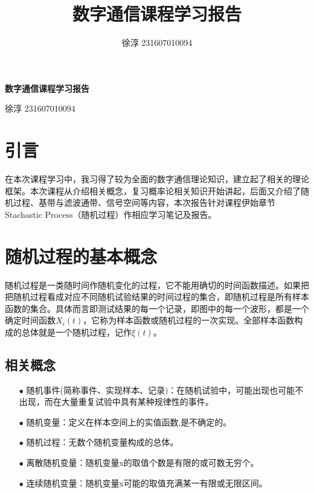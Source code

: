 \documentclass[12pt,a4paper,oneside]{ctexart}
\title{\vspace{-4cm}\textbf{数字通信课程学习报告}}
\author{徐淳 231607010094}
\begin{document}
\pagestyle{plain}
\setlength{\topmargin}{-18mm}
\begin{center}
    \textbf{\huge{数字通信课程学习报告}}
\end{center}
\begin{center}
    \large{徐淳 231607010094}
\end{center}
\section{引言}  
在本次课程学习中，我习得了较为全面的数字通信理论知识，建立起了相关的理论框架。本次课程从介绍相关概念，复习概率论相关知识开始讲起，后面又介绍了随机过程、基带与滤波通带、信号空间等内容，本次报告针对课程伊始章节Stachastic Process（随机过程）作相应学习笔记及报告。
\section{随机过程的基本概念}
随机过程是一类随时间作随机变化的过程，它不能用确切的时间函数描述。如果把把随机过程看成对应不同随机试验结果的时间过程的集合，即随机过程是所有样本函数的集合。具体而言即测试结果的每一个记录，即图中的每一个波形，都是一个确定时间函数$X_{i}(t)$，它称为样本函数或随机过程的一次实现。全部样本函数构成的总体就是一个随机过程，记作$\xi(t)$。
    \subsection{相关概念}
        \begin{itemize}
            \item[$\bullet$] 随机事件(简称事件、实现样本、记录)：在随机试验中，可能出现也可能不出现，而在大量重复试验中具有某种规律性的事件。
            \item[$\bullet$] 随机变量：定义在样本空间上的实值函数,是不确定的。
            \item[$\bullet$] 随机过程：无数个随机变量构成的总体。
            \item[$\bullet$] 离散随机变量：随机变量x的取值个数是有限的或可数无穷个。
            \item[$\bullet$] 连续随机变量：随机变量x可能的取值充满某一有限或无限区间。
        \end{itemize}
\end{document}
